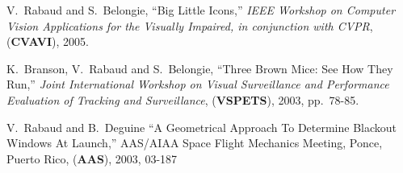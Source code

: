 V.~Rabaud and S.~Belongie, ``Big Little Icons,'' {\em IEEE Workshop on Computer Vision Applications for the Visually 
Impaired, in conjunction with CVPR}, (\textbf{CVAVI}), 2005.

K.\ Branson, V.\ Rabaud and S.\ Belongie, ``Three Brown Mice: See How They Run,''
{\em Joint International Workshop on Visual Surveillance and Performance Evaluation of Tracking and Surveillance}, 
(\textbf{VSPETS}), 2003, pp.\ 78-85. 

V.\ Rabaud and B.\ Deguine ``A Geometrical Approach To Determine Blackout Windows At Launch,''
AAS/AIAA Space Flight Mechanics Meeting, Ponce, Puerto Rico, (\textbf{AAS}), 2003, 03-187 
